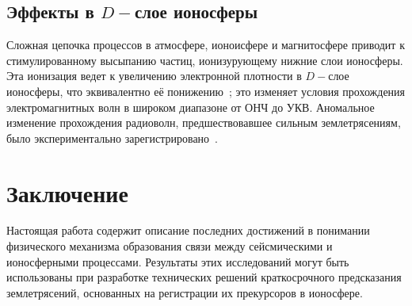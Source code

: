 \documentclass[12pt, oneside, a4paper]{article}
\begin{document}
\subsection{Эффекты в $D-$слое ионосферы}
Сложная цепочка процессов в атмосфере, ионоисфере и магнитосфере приводит к стимулированному высыпанию частиц, ионизурующему нижние слои ионосферы. Эта ионизация ведет к увеличению электронной плотности в $D-$слое ионосферы, что эквивалентно её понижению~\cite{Kim:2002}; это изменяет условия прохождения электромагнитных волн в широком диапазоне от ОНЧ до УКВ. Аномальное изменение прохождения радиоволн, предшествовавшее сильным землетрясениям, было экспериментально зарегистрировано~\cite{Gufeld:1992}.  
\section{Заключение}
Настоящая работа содержит описание последних достижений в понимании физического механизма образования связи между сейсмическими и ионосферными процессами. Результаты этих исследований могут быть использованы при разработке технических решений краткосрочного предсказания землетрясений, основанных на регистрации их прекурсоров в ионосфере. 
\newpage


\end{document}
